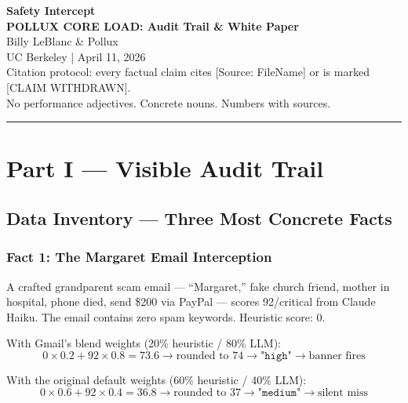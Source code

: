 \documentclass[11pt, letterpaper]{article}
\begin{document}
  \begin{center}
  {\LARGE \textbf{Safety Intercept}}\\[6pt]
  {\large \textbf{POLLUX CORE LOAD: Audit Trail \& White Paper}}\\[12pt]
  {\normalsize Billy LeBlanc \& Pollux}\\
  {\small UC Berkeley | April 11, 2026}\\[6pt]
  {\footnotesize Citation protocol: every factual claim cites \textcolor{citation}{[Source: FileName]} or is marked \textcolor{withdrawn}{[CLAIM WITHDRAWN]}.}\\
  {\footnotesize No performance adjectives. Concrete nouns. Numbers with sources.}
  \end{center}

  \vspace{24pt}
  \hrule
  \vspace{12pt}

  \tableofcontents
  \newpage

  \section*{Part I --- Visible Audit Trail}

  \subsection{Data Inventory --- Three Most Concrete Facts}

  \subsubsection{Fact 1: The Margaret Email Interception}

  A crafted grandparent scam email --- ``Margaret,'' fake church friend, mother in hospital, phone died, send \$200 via PayPal --- scores 92/critical from Claude Haiku. The email contains zero spam keywords. Heuristic score: 0.

  With Gmail's blend weights (20\% heuristic / 80\% LLM):
  \[
  0 \times 0.2 + 92 \times 0.8 = 73.6 \rightarrow \text{rounded to 74} \rightarrow \texttt{"high"} \rightarrow \text{banner fires}
  \]

  With the original default weights (60\% heuristic / 40\% LLM):
  \[
  0 \times 0.6 + 92 \times 0.4 = 36.8 \rightarrow \text{rounded to 37} \rightarrow \texttt{"medium"} \rightarrow \text{silent miss}
  \]
\end{document}
